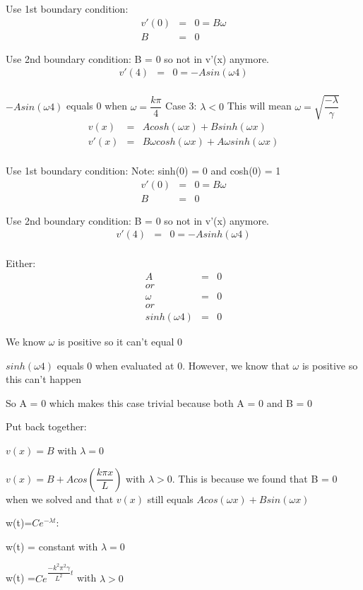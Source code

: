 \documentclass{article}
\newcommand{\bea}{\begin{eqnarray*}}
\newcommand{\eea}{\end{eqnarray*}}
\begin{document}
Use 1st boundary condition:
\bea
v'(0) &=& 0 = B\omega\\
B &=& 0
\eea

Use 2nd boundary condition: B = 0 so not in v'(x) anymore.
\bea
v'(4) &=& 0 = -Asin(\omega 4)\\
\eea

$-Asin(\omega 4)$ equals 0 when $\omega = \dfrac{k\pi}{4}$ \newline
Case 3: $\lambda < 0$ This will mean $\omega=\sqrt{\dfrac{-\lambda}{\gamma}}$
\bea
v(x) &=& Acosh(\omega x)+Bsinh(\omega x) \\
v'(x) &=& B\omega cosh(\omega x)+A\omega sinh(\omega x)  \\
\eea

Use 1st boundary condition: \newline
Note: sinh(0) = 0 and cosh(0) = 1
\bea
v'(0) &=& 0 = B\omega\\
B &=& 0
\eea

Use 2nd boundary condition: B = 0 so not in v'(x) anymore.
\bea
v'(4) &=& 0 = -Asinh(\omega 4)\\
\eea

Either:
\bea
A &=& 0 \\
or\\
\omega &=& 0 \\
or\\
sinh(\omega 4) &=& 0
\eea

We know $\omega$ is positive so it can't equal 0\newline 

$sinh(\omega 4)$ equals 0 when evaluated at 0. However, we know that $\omega$ is positive so this can't happen \newline

So A = 0 which makes this case trivial because both A = 0 and B = 0 \newline 

Put back together:

$v(x) = B$ with $\lambda=0$\newline 

$v(x) = B + Acos(\dfrac{k \pi x}{L})$ with $\lambda > 0$.  This is because we found that B = 0 when we solved and that $v(x)$ still equals $Acos(\omega x)+Bsin(\omega x)$  \newline

w(t)=$Ce^{-\lambda t}$:

w(t) = constant with  $\lambda = 0$

w(t) =$Ce^{\dfrac{-k^2 \pi^2 \gamma }{L^2}t}$ with $\lambda > 0$
\end{document}
